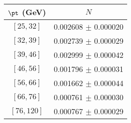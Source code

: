 \begin{tabular}{c||c}
$\pt$ (GeV) & $N$  \\
\hline
$[25, 32]$ & 0.002608 $\pm$ 0.000020\\
$[32, 39]$ & 0.002739 $\pm$ 0.000029\\
$[39, 46]$ & 0.002999 $\pm$ 0.000042\\
$[46, 56]$ & 0.001796 $\pm$ 0.000031\\
$[56, 66]$ & 0.001662 $\pm$ 0.000044\\
$[66, 76]$ & 0.000761 $\pm$ 0.000030\\
$[76, 120]$ & 0.000767 $\pm$ 0.000029\\
\end{tabular}
